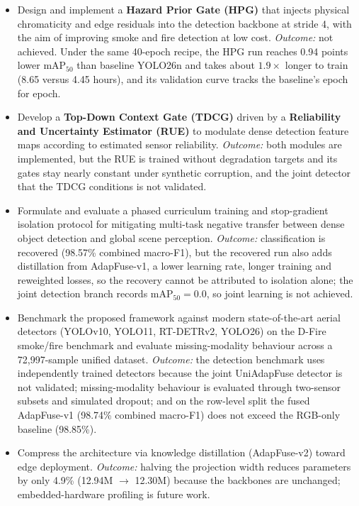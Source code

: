 \begin{itemize}
    \item Design and implement a \textbf{Hazard Prior Gate (HPG)} that injects physical chromaticity and edge residuals into the detection backbone at stride 4, with the aim of improving smoke and fire detection at low cost. \textit{Outcome:} not achieved. Under the same 40-epoch recipe, the HPG run reaches 0.94 points lower $\mathrm{mAP}_{50}$ than baseline YOLO26n and takes about $1.9\times$ longer to train (8.65 versus 4.45 hours), and its validation curve tracks the baseline's epoch for epoch.
    \item Develop a \textbf{Top-Down Context Gate (TDCG)} driven by a \textbf{Reliability and Uncertainty Estimator (RUE)} to modulate dense detection feature maps according to estimated sensor reliability. \textit{Outcome:} both modules are implemented, but the RUE is trained without degradation targets and its gates stay nearly constant under synthetic corruption, and the joint detector that the TDCG conditions is not validated.
    \item Formulate and evaluate a phased curriculum training and stop-gradient isolation protocol for mitigating multi-task negative transfer between dense object detection and global scene perception. \textit{Outcome:} classification is recovered (98.57\% combined macro-F1), but the recovered run also adds distillation from AdapFuse-v1, a lower learning rate, longer training and reweighted losses, so the recovery cannot be attributed to isolation alone; the joint detection branch records $\mathrm{mAP}_{50}=0.0$, so joint learning is not achieved.
    \item Benchmark the proposed framework against modern state-of-the-art aerial detectors (YOLOv10, YOLO11, RT-DETRv2, YOLO26) on the D-Fire smoke/fire benchmark and evaluate missing-modality behaviour across a 72,997-sample unified dataset. \textit{Outcome:} the detection benchmark uses independently trained detectors because the joint UniAdapFuse detector is not validated; missing-modality behaviour is evaluated through two-sensor subsets and simulated dropout; and on the row-level split the fused AdapFuse-v1 (98.74\% combined macro-F1) does not exceed the RGB-only baseline (98.85\%).
    \item Compress the architecture via knowledge distillation (AdapFuse-v2) toward edge deployment. \textit{Outcome:} halving the projection width reduces parameters by only 4.9\% (12.94M $\to$ 12.30M) because the backbones are unchanged; embedded-hardware profiling is future work.
\end{itemize}

